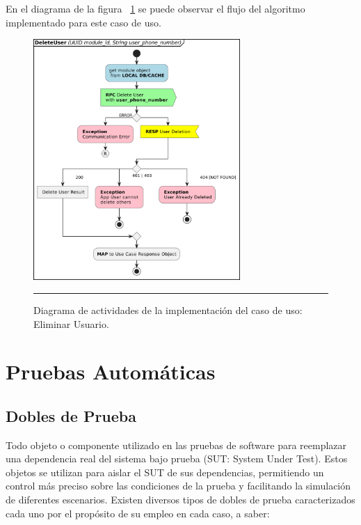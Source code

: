 En el diagrama de la figura ~\ref{fig:act_deleteUser} se puede observar el flujo del algoritmo implementado para este caso de uso.

\begin{figure}[htbp]
	\centering
	\includegraphics[width=0.7\textwidth]{Figures/iter2/ACT_deleteUser.png}
	\rule{35em}{1pt}
	\caption[Actividades Eliminar Usuario]{Diagrama de actividades de la implementación del caso de uso: Eliminar Usuario.}
	\label{fig:act_deleteUser}
\end{figure}

\section{Pruebas Automáticas}

\subsection{Dobles de Prueba}
Todo objeto o componente utilizado en las pruebas de software para reemplazar una dependencia real del sistema bajo prueba (SUT: System Under Test). Estos objetos se utilizan para aislar el SUT de sus dependencias, permitiendo un control más preciso sobre las condiciones de la prueba y facilitando la simulación de diferentes escenarios.
Existen diversos tipos de dobles de prueba caracterizados cada uno por el propósito de su empleo en cada caso, a saber:

